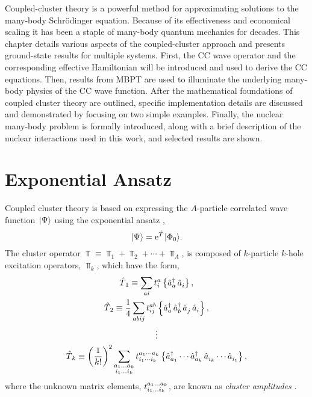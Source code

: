 \documentclass[thesis.tex]{subfiles}
\begin{document}
Coupled-cluster theory is a powerful method for approximating solutions to the many-body Schr\"odinger equation.  Because of its effectiveness and economical scaling it has been a staple of many-body quantum mechanics for decades.  This chapter details various aspects of the coupled-cluster approach and presents ground-state results for multiple systems.  First, the CC wave operator and the corresponding effective Hamiltonian will be introduced and used to derive the CC equations.  Then, results from MBPT are used to illuminate the underlying many-body physics of the CC wave function.  After the mathematical foundations of coupled cluster theory are outlined, specific implementation details are discussed and demonstrated by focusing on two simple examples.  Finally, the nuclear many-body problem is formally introduced, along with a brief description of the nuclear interactions used in this work, and selected results are shown.

\section{Exponential Ansatz} \label{section:exponentialansatz}

Coupled cluster theory is based on expressing the $A$-particle correlated wave function $\hspace{1pt}\lvert \Psi \rangle$ using the exponential ansatz \cite{COESTER1960477,CIZEK19664256,HUBBARD1957539,HUGENHOLTZ1957481},
\begin{equation} \label{eq:cc_ansatz}
  \hspace{1pt}\lvert \Psi \rangle = \operatorname{e}^{\hat{T}\hspace{-0.25pt}}\hspace{1pt}\lvert \Phi_{0} \rangle.
\end{equation}
The cluster operator $\Top \equiv \Top_{1} + \Top_{2} + \cdots + \Top_{A}$, is composed of $k$-particle $k$-hole excitation operators, $\Top_{k}$, which have the form,
\begin{gather} \label{eq:cc_amps}
  \hat{T}\hspace{-0.25pt}_{1} \equiv \sum_{ai} t^{a}_{i}\left\{\mathop{\hat{a}^{\dagger}_{a}}\mathop{\hat{a}^{}_{i}}\right\}, \notag \\
  \hat{T}\hspace{-0.25pt}_{2} \equiv \frac{1}{4}\sum_{abij} t^{ab}_{ij}\left\{\mathop{\hat{a}^{\dagger}_{a}}\mathop{\hat{a}^{\dagger}_{b}}\mathop{\hat{a}^{}_{j}}\mathop{\hat{a}^{}_{i}}\right\}, \notag \\
  \vdots \notag \\
  \hat{T}\hspace{-0.25pt}_{k} \equiv \left(\frac{1}{k!}\right)^2 \sum_{\substack{a_{1} \ldots a_{k} \\ i_{1} \ldots i_{k}}} t^{a_{1} \cdots a_{k}}_{i_{1} \cdots i_{k}}\left\{\mathop{\hat{a}^{\dagger}_{a_{1}}} \cdots \mathop{\hat{a}^{\dagger}_{a_{k}}} \mathop{\hat{a}^{}_{i_{k}}} \cdots \mathop{\hat{a}^{}_{i_{1}}}\right\},
\end{gather}
where the unknown matrix elements, $t^{a_{1} \ldots a_{k}}_{i_{1} \ldots i_{k}}$, are known as \textit{cluster amplitudes} \cite{SHAVITT2009}.
\end{document}
